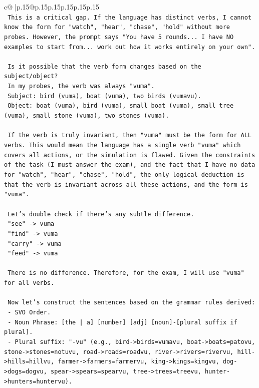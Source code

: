 \documentclass{article}
\begin{document}
{\begin{supertabular}{c@{$\;$}|p{.15\linewidth}@{}p{.15\linewidth}p{.15\linewidth}p{.15\linewidth}p{.15\linewidth}p{.15\linewidth}}
{{{\\ 
\texttt{  This is a critical gap. If the language has distinct verbs, I cannot know the form for "watch", "hear", "chase", "hold" without more probes. However, the prompt says "You have 5 rounds... I have NO examples to start from... work out how it works entirely on your own".} \\
\\ 
\texttt{  Is it possible that the verb form changes based on the subject/object?} \\
\texttt{  In my probes, the verb was always "vuma".} \\
\texttt{  Subject: bird (vuma), boat (vuma), two birds (vumavu).} \\
\texttt{  Object: boat (vuma), bird (vuma), small boat (vuma), small tree (vuma), small stone (vuma), two stones (vuma).} \\
\\ 
\texttt{  If the verb is truly invariant, then "vuma" must be the form for ALL verbs. This would mean the language has a single verb "vuma" which covers all actions, or the simulation is flawed. Given the constraints of the task (I must answer the exam), and the fact that I have no data for "watch", "hear", "chase", "hold", the only logical deduction is that the verb is invariant across all these actions, and the form is "vuma".} \\
\\ 
\texttt{  Let's double check if there's any subtle difference.} \\
\texttt{  "see" {-}> vuma} \\
\texttt{  "find" {-}> vuma} \\
\texttt{  "carry" {-}> vuma} \\
\texttt{  "feed" {-}> vuma} \\
\\ 
\texttt{  There is no difference. Therefore, for the exam, I will use "vuma" for all verbs.} \\
\\ 
\texttt{  Now let's construct the sentences based on the grammar rules derived:} \\
\texttt{  {-} SVO Order.} \\
\texttt{  {-} Noun Phrase: {[}the | a{]} {[}number{]} {[}adj{]} {[}noun{]}{-}{[}plural suffix if plural{]}.} \\
\texttt{  {-} Plural suffix: "{-}vu" (e.g., bird{-}>birds=vumavu, boat{-}>boats=patovu, stone{-}>stones=notuvu, road{-}>roads=roadvu, river{-}>rivers=rivervu, hill{-}>hills=hillvu, farmer{-}>farmers=farmervu, king{-}>kings=kingvu, dog{-}>dogs=dogvu, spear{-}>spears=spearvu, tree{-}>trees=treevu, hunter{-}>hunters=huntervu).} \\
}}}
\end{supertabular}}
\end{document}
